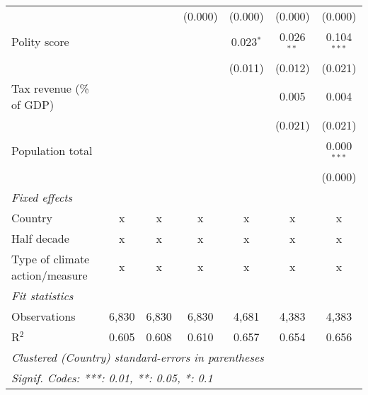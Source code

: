 \begin{tabular}{lcccccc}
                                                                               &         &                & (0.000)        & (0.000)        & (0.000)        & (0.000)\\   
   Polity score                                                                &         &                &                & 0.023$^{*}$    & 0.026$^{**}$   & 0.104$^{***}$\\   
                                                                               &         &                &                & (0.011)        & (0.012)        & (0.021)\\   
   Tax revenue (\% of GDP)                                                     &         &                &                &                & 0.005          & 0.004\\   
                                                                               &         &                &                &                & (0.021)        & (0.021)\\   
   Population total                                                            &         &                &                &                &                & 0.000$^{***}$\\   
                                                                               &         &                &                &                &                & (0.000)\\   
   \emph{Fixed effects}\\
   Country                                                                     & x       & x              & x              & x              & x              & x\\  
   Half decade                                                                 & x       & x              & x              & x              & x              & x\\  
   Type of climate action/measure                                              & x       & x              & x              & x              & x              & x\\  
   \midrule \emph{Fit statistics}\\
   Observations                                                                & 6,830   & 6,830          & 6,830          & 4,681          & 4,383          & 4,383\\  
   R$^2$                                                                       & 0.605   & 0.608          & 0.610          & 0.657          & 0.654          & 0.656\\  
   \midrule
   \multicolumn{7}{l}{\emph{Clustered (Country) standard-errors in parentheses}}\\
   \multicolumn{7}{l}{\emph{Signif. Codes: ***: 0.01, **: 0.05, *: 0.1}}\\
\end{tabular}
\par\endgroup


